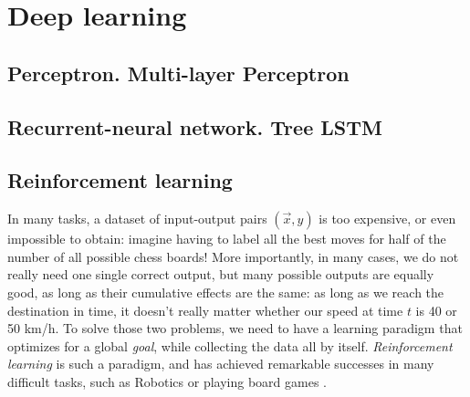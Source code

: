\section{Deep learning}
\subsection{Perceptron. Multi-layer Perceptron}
\subsection{Recurrent-neural network. Tree LSTM}
\subsection{Reinforcement learning}
In many tasks, a dataset of input-output pairs $(\vec{x}, y)$ is too expensive, or even impossible to obtain: imagine having to label all the best moves for half of the number of all possible chess boards! More importantly, in many cases, we do not really need one single correct output, but many possible outputs are equally good, as long as their cumulative effects are the same: as long as we reach the destination in time, it doesn't really matter whether our speed at time $t$ is 40 or 50 km/h. To solve those two problems, we need to have a learning paradigm that optimizes for a global \emph{goal}, while collecting the data all by itself. \emph{Reinforcement learning} is such a paradigm, and has achieved remarkable successes in many difficult tasks, such as Robotics \cite{convai} or playing board games \cite{td-gammon, alphago}.
